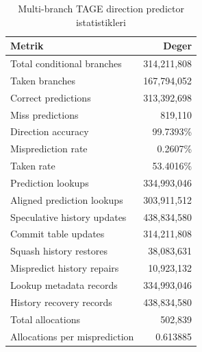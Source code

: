 \documentclass[11pt,a4paper]{article}
\begin{document}
\begin{table}[!htbp]
\centering
\caption{Multi-branch TAGE direction predictor istatistikleri}
\label{tab:mytage-results}
\small
\begin{tabular}{lr}
\toprule
Metrik & Deger \\
\midrule
Total conditional branches & 314,211,808 \\
Taken branches & 167,794,052 \\
Correct predictions & 313,392,698 \\
Miss predictions & 819,110 \\
Direction accuracy & 99.7393\% \\
Misprediction rate & 0.2607\% \\
Taken rate & 53.4016\% \\
Prediction lookups & 334,993,046 \\
Aligned prediction lookups & 303,911,512 \\
Speculative history updates & 438,834,580 \\
Commit table updates & 314,211,808 \\
Squash history restores & 38,083,631 \\
Mispredict history repairs & 10,923,132 \\
Lookup metadata records & 334,993,046 \\
History recovery records & 438,834,580 \\
Total allocations & 502,839 \\
Allocations per misprediction & 0.613885 \\
\bottomrule
\end{tabular}
\end{table}
\end{document}
